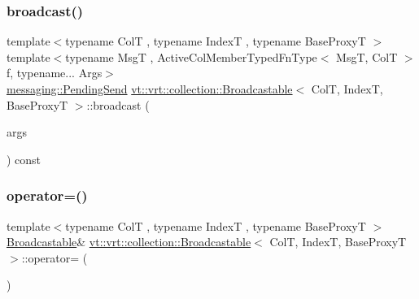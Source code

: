 \mbox{\label{structvt_1_1vrt_1_1collection_1_1_broadcastable_a96cd21a1be6313144a8c4aa3683eaa05}} 
\subsubsection{\texorpdfstring{broadcast()}{broadcast()}\hspace{0.1cm}{\footnotesize\ttfamily [6/6]}}
{\footnotesize\ttfamily template$<$typename ColT , typename IndexT , typename Base\+ProxyT $>$ \\
template$<$typename MsgT , Active\+Col\+Member\+Typed\+Fn\+Type$<$ Msg\+T, Col\+T $>$ f, typename... Args$>$ \\
\hyperlink{structvt_1_1messaging_1_1_pending_send}{messaging\+::\+Pending\+Send} \hyperlink{structvt_1_1vrt_1_1collection_1_1_broadcastable}{vt\+::vrt\+::collection\+::\+Broadcastable}$<$ ColT, IndexT, Base\+ProxyT $>$\+::broadcast (\begin{DoxyParamCaption}\item[{Args \&\&...}]{args }\end{DoxyParamCaption}) const}

\mbox{\label{structvt_1_1vrt_1_1collection_1_1_broadcastable_a40df56c587e61448857f71acedce53bc}} 
\subsubsection{\texorpdfstring{operator=()}{operator=()}}
{\footnotesize\ttfamily template$<$typename ColT , typename IndexT , typename Base\+ProxyT $>$ \\
\hyperlink{structvt_1_1vrt_1_1collection_1_1_broadcastable}{Broadcastable}\& \hyperlink{structvt_1_1vrt_1_1collection_1_1_broadcastable}{vt\+::vrt\+::collection\+::\+Broadcastable}$<$ ColT, IndexT, Base\+ProxyT $>$\+::operator= (\begin{DoxyParamCaption}\item[{\hyperlink{structvt_1_1vrt_1_1collection_1_1_broadcastable}{Broadcastable}$<$ ColT, IndexT, Base\+ProxyT $>$ const \&}]{ }\end{DoxyParamCaption})\hspace{0.3cm}{\ttfamily [default]}}



